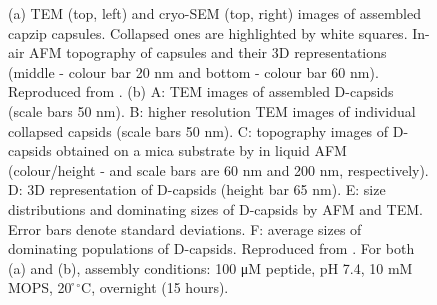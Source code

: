 \begin{figure}
\begin{center}
 \hspace{0.3cm}
\caption[Miscoscopy experiments results on capzip capsules]{(a) TEM (top, left) and cryo-SEM (top, right) images of assembled capzip capsules. Collapsed ones are highlighted by white squares. In-air AFM topography of capsules and their 3D representations (middle - colour bar 20 nm and bottom - colour bar 60 nm). Reproduced from \citet{Castelletto2016}. (b) A: TEM images of assembled D-capsids (scale bars 50 nm). B: higher resolution TEM images of individual collapsed capsids (scale bars 50 nm). C: topography images of D-capsids obtained on a mica substrate by in liquid AFM (colour/height - and scale bars are 60 nm and 200 nm, respectively). D: 3D representation of D-capsids (height bar 65 nm). E: size distributions and dominating sizes of D-capsids by AFM and TEM. Error bars denote standard deviations. F: average sizes of dominating populations of D-capsids. Reproduced from \citet{Kepiro2019}. For both (a) and (b), assembly conditions: 100 μM peptide, pH 7.4, 10 mM MOPS, 20 ̊$^{\circ}$C, overnight (15 hours).} \label{fig:exp_structure}
\end{center}
\end{figure}


